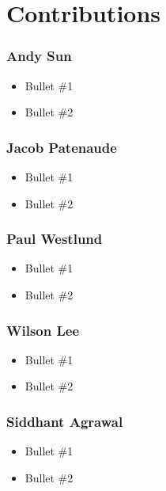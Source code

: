 \section{Contributions}

\subsubsection*{Andy Sun}
\begin{itemize}
\item Bullet \#1
\item Bullet \#2
\end{itemize}

\subsubsection*{Jacob Patenaude}
\begin{itemize}
\item Bullet \#1
\item Bullet \#2
\end{itemize}

\subsubsection*{Paul Westlund}
\begin{itemize}
\item Bullet \#1
\item Bullet \#2
\end{itemize}

\subsubsection*{Wilson Lee}
\begin{itemize}
\item Bullet \#1
\item Bullet \#2
\end{itemize}

\subsubsection*{Siddhant Agrawal}
\begin{itemize}
\item Bullet \#1
\item Bullet \#2
\end{itemize}
